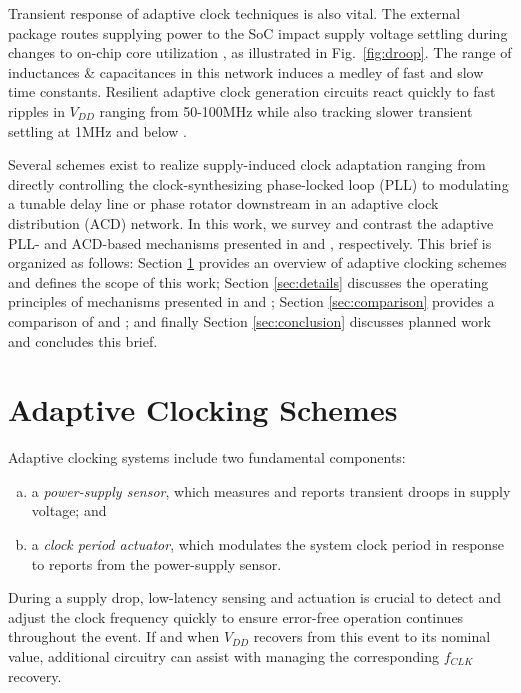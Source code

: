 \documentclass[twoside,9pt,journal,letterpage]{IEEEtran}
\begin{document}
\pubidadjcol
Transient response of adaptive clock techniques is also vital. The external package routes supplying power to the SoC impact supply voltage settling during changes to on-chip core utilization \cite{hashimoto2018}, as illustrated in Fig.\ \ref{fig:droop}. The range of inductances \& capacitances in this network induces a medley of fast and slow time constants. Resilient adaptive clock generation circuits react quickly to fast ripples in $V_{DD}$ ranging from 50-100MHz \cite{hashimoto2018,wilcox2015} while also tracking slower transient settling at 1MHz and below \cite{hashimoto2018,bowman2016,wilcox2015}.

Several schemes exist to realize supply-induced clock adaptation ranging from directly controlling the clock-synthesizing phase-locked loop (PLL)\cite{ahmad2017,hashimoto2018} to modulating a tunable delay line or phase rotator downstream in an adaptive clock distribution (ACD) network\cite{bowman2016,floyd2017,wilcox2015,kwak2016self}. In this work, we survey and contrast the adaptive PLL- and ACD-based mechanisms presented in \cite{hashimoto2018} and \cite{wilcox2015}, respectively. This brief is organized as follows: Section \ref{sec:overview} provides an overview of adaptive clocking schemes and defines the scope of this work; Section \ref{sec:details} discusses the operating principles of mechanisms presented in \cite{hashimoto2018} and \cite{wilcox2015}; Section \ref{sec:comparison} provides a comparison of \cite{hashimoto2018} and \cite{wilcox2015}; and finally Section \ref{sec:conclusion} discusses planned work and concludes this brief.

\section{Adaptive Clocking Schemes}
\label{sec:overview}

Adaptive clocking systems include two fundamental components:

\begin{enumerate}[(a)]
\item a \textit{power-supply sensor}, which measures and
reports transient droops in supply voltage; and
\item a \textit{clock period actuator}, which modulates the
system clock period in response to reports from
the power-supply sensor.
\end{enumerate}

During a supply drop, low-latency sensing and actuation is crucial to detect and adjust the clock frequency quickly to ensure error-free operation continues throughout the event. If and when $V_{DD}$ recovers from this event to its nominal value, additional circuitry can assist with managing the corresponding $f_{CLK}$ recovery.
\end{document}
